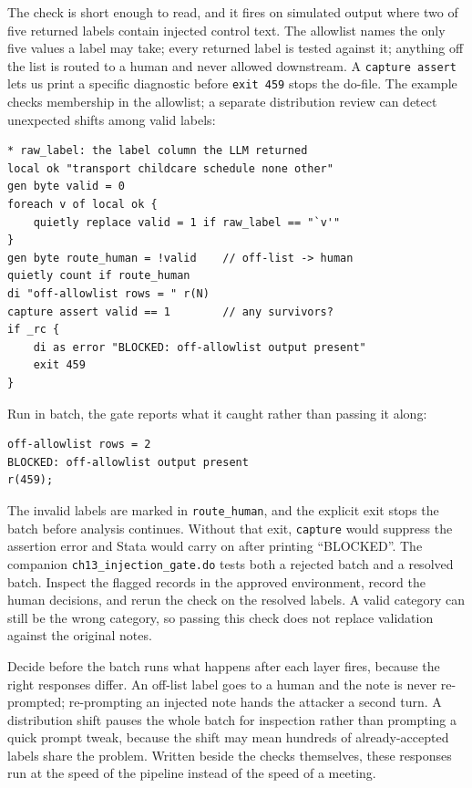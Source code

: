 \documentclass[
    a4paper,
    fontsize=10pt,
    twoside=true,
    numbers=noenddot,
]{kaobook}
\begin{document}
The check is short enough to read, and it fires on simulated output where two of five returned labels contain injected control text. The allowlist names the only five values a label may take; every returned label is tested against it; anything off the list is routed to a human and never allowed downstream. A \texttt{capture assert} lets us print a specific diagnostic before \texttt{exit 459} stops the do-file. The example checks membership in the allowlist; a separate distribution review can detect unexpected shifts among valid labels:
\par
{\footnotesize
\begin{verbatim}
* raw_label: the label column the LLM returned
local ok "transport childcare schedule none other"
gen byte valid = 0
foreach v of local ok {
    quietly replace valid = 1 if raw_label == "`v'"
}
gen byte route_human = !valid    // off-list -> human
quietly count if route_human
di "off-allowlist rows = " r(N)
capture assert valid == 1        // any survivors?
if _rc {
    di as error "BLOCKED: off-allowlist output present"
    exit 459
}
\end{verbatim}
}
Run in batch, the gate reports what it caught rather than passing it along:
\par
{\footnotesize
\begin{verbatim}
off-allowlist rows = 2
BLOCKED: off-allowlist output present
r(459);
\end{verbatim}
}
The invalid labels are marked in \texttt{route\_human}, and the explicit exit stops the batch before analysis continues. Without that exit, \texttt{capture} would suppress the assertion error and Stata would carry on after printing \enquote{BLOCKED}. The companion \texttt{ch13\_injection\_gate.do} tests both a rejected batch and a resolved batch. Inspect the flagged records in the approved environment, record the human decisions, and rerun the check on the resolved labels. A valid category can still be the wrong category, so passing this check does not replace validation against the original notes.

Decide before the batch runs what happens after each layer fires, because the right responses differ. An off-list label goes to a human and the note is never re-prompted; re-prompting an injected note hands the attacker a second turn. A distribution shift pauses the whole batch for inspection rather than prompting a quick prompt tweak, because the shift may mean hundreds of already-accepted labels share the problem. Written beside the checks themselves, these responses run at the speed of the pipeline instead of the speed of a meeting.
\end{document}
